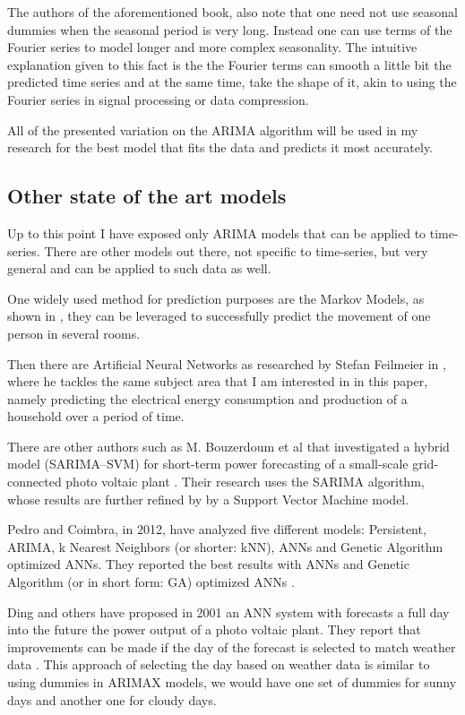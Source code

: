 \documentclass[12pt,a4paper,titlepage]{report}
\begin{document}
The authors of the aforementioned book, also note that one need not use seasonal dummies when the seasonal period is very long. Instead one can use terms of the Fourier series \cite{fpp2dhr} to model longer and more complex seasonality. The intuitive explanation given to this fact is the the Fourier terms can smooth a little bit the predicted time series and at the same time, take the shape of it, akin to using the Fourier series in signal processing or data compression.

All of the presented variation on the ARIMA algorithm will be used in my research for the best model that fits the data and predicts it most accurately.

\subsection{Other state of the art models}

Up to this point I have exposed only ARIMA models that can be applied to time-series. There are other models out there, not specific to time-series, but very general and can be applied to such data as well.

One widely used method for prediction purposes are the Markov Models, as shown in \cite{markovpersonmovement}, they can be leveraged to successfully predict the movement of one person in several rooms.

Then there are Artificial Neural Networks as researched by Stefan Feilmeier in \cite{feilmeier}, where he tackles the same subject area that I am interested in in this paper, namely predicting the electrical energy consumption and production of a household over a period of time.

There are other authors such as M. Bouzerdoum et al that investigated a hybrid model (SARIMA–SVM) for short-term power forecasting
of a small-scale grid-connected photo voltaic plant \cite{bouzerdoum}. Their research uses the SARIMA algorithm, whose results are further refined by by a Support Vector Machine model.

Pedro and Coimbra, in 2012, have analyzed five different models: Persistent, ARIMA, k Nearest Neighbors (or shorter: kNN), ANNs and Genetic Algorithm optimized ANNs. They reported the best results with ANNs and Genetic Algorithm (or in short form: GA) optimized ANNs \cite{pedrocoimbra}.

Ding and others have proposed in 2001 an ANN system with forecasts a full day into the future the power output of a photo voltaic plant. They report that improvements can be made if the day of the forecast is selected to match weather data \cite{ding2011ann}. This approach of selecting the day based on weather data is similar to using dummies in ARIMAX models, we would have one set of dummies for sunny days and another one for cloudy days.
\end{document}
